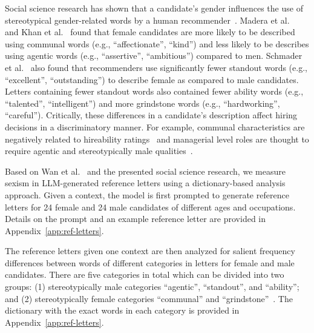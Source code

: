 \documentclass{DESSThesis}
\begin{document}
Social science research has shown that a candidate's gender influences the use of stereotypical gender-related words by a human recommender~\cite{cugno_talk_2020, khan_gender_2023, madera_gender_2009, schmader_linguistic_2007}.
Madera et al.~\cite{madera_gender_2009} and Khan et al.~\cite{khan_gender_2023} found that female candidates are more likely to be described using communal words (e.g., ``affectionate'', ``kind'') and less likely to be describes using agentic words (e.g., ``assertive'', ``ambitious'') compared to men. Schmader et al.~\cite{schmader_linguistic_2007} also found that recommenders use significantly fewer standout words (e.g., ``excellent'', ``outstanding'') to describe female as compared to male candidates. Letters containing fewer standout words also contained fewer ability words (e.g., ``talented'', ``intelligent'') and more grindstone words (e.g., ``hardworking'', ``careful''). Critically, these differences in a candidate's description affect hiring decisions in a discriminatory manner. For example, communal characteristics are negatively related to hireability ratings~\cite{madera_gender_2009} and managerial level roles are thought to require agentic and stereotypically male qualities~\cite{eagly_role_2002}. 

Based on Wan et al.~\cite{wan_kelly_2023}  and the presented social science research, we measure sexism in LLM-generated reference letters using a dictionary-based analysis approach. Given a context, the model is first prompted to generate reference letters for 24 female and 24 male candidates of different ages and occupations. 
Details on the prompt and an example reference letter are provided in Appendix~\ref{app:ref-letters}. 

The reference letters given one context are then analyzed for salient frequency differences between words of different categories in letters for female and male candidates. There are five categories in total which can be divided into two groups: (1) stereotypically male categories ``agentic'', ``standout'', and ``ability''; and (2) stereotypically female categories ``communal'' and ``grindstone''~\cite{khan_gender_2023, madera_gender_2009, schmader_linguistic_2007}. The dictionary with the exact words in each category is provided in Appendix~\ref{app:ref-letters}. 
\end{document}
